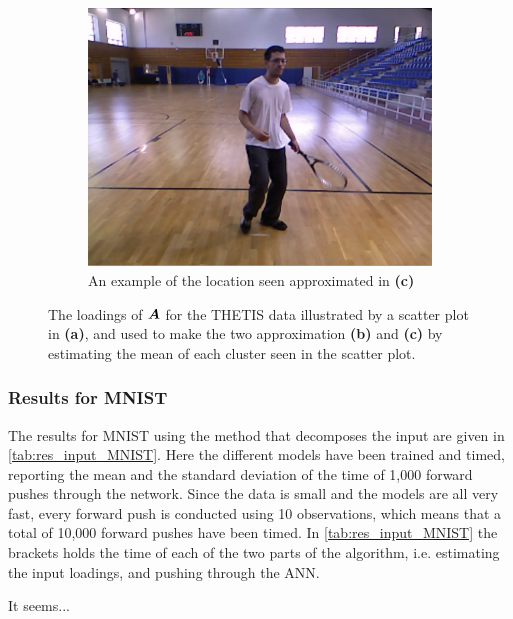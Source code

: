\begin{figure}
\begin{subfigure}{.45\linewidth}
        \captionsetup{width=.95\linewidth}
        \includegraphics[width=.78\linewidth]{Pics/06_results/loc_2_real.png}
        \caption{An example of the location seen approximated in \textbf{(c)}}
    \end{subfigure}
    \caption{The loadings of $\boldsymbol{A}$ for the THETIS data illustrated by a scatter plot in \textbf{(a)}, and used to make the two approximation \textbf{(b)} and \textbf{(c)} by estimating the mean of each cluster seen in the scatter plot.}
    \label{fig:scatter_plot_THETIS}
\end{figure}

\subsubsection{Results for MNIST}
The results for MNIST using the method that decomposes the input are given in \autoref{tab:res_input_MNIST}. Here the different models have been trained and timed, reporting the mean and the standard deviation of the time of 1,000 forward pushes through the network. Since the data is small and the models are all very fast, every forward push is conducted using 10 observations, which means that a total of 10,000 forward pushes have been timed. In \autoref{tab:res_input_MNIST}
the brackets holds the time of each of the two parts of the algorithm, i.e. estimating the input loadings, and pushing through the ANN. 

It seems... 


